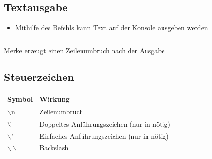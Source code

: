 \subsection{Textausgabe}
\begin{frame}
	\slidehead
	\begin{itemize}
		\item Mithilfe des Befehls  kann Text auf der Konsole ausgeben werden
	\end{itemize}
	\begin{columns}
		\begin{column}{6cm}
		\end{column}
		\begin{column}{6cm}
		\end{column}
	\end{columns}

	\begin{block}{Merke}
		 erzeugt einen Zeilenumbruch nach der Ausgabe
	\end{block}
\end{frame}

\subsection{Steuerzeichen}
\begin{frame}
	\slidehead

	\begin{table}[htbp]
		\begin{tabular}{|l|l|}
			\hline
			\textbf{Symbol} & \textbf{Wirkung} \\ \hline
			$\backslash$n & Zeilenumbruch \\ \hline
			$\backslash$\" & Doppeltes Anführungszeichen  (nur in \pythoninline{" "} nötig) \\ \hline
			$\backslash$' & Einfaches Anführungszeichen (nur in \pythoninline{' '} nötig) \\ \hline
			$\backslash \backslash$ & Backslash \\ \hline
		\end{tabular}
		\label{}
	\end{table}

\end{frame}

